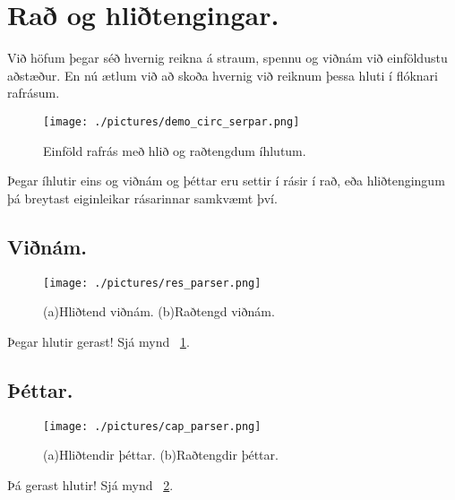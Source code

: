 \section{Rað og hliðtengingar.}
Við höfum þegar séð hvernig reikna á straum, spennu og viðnám við einföldustu aðstæður. En nú ætlum við að skoða hvernig við reiknum þessa hluti í flóknari
rafrásum.
\begin{figure}[htb]
	\center
		\texttt{[image: ./pictures/demo\_circ\_serpar.png]}
		\caption{Einföld rafrás með hlið og raðtengdum íhlutum.}
\end{figure}
Þegar íhlutir eins og viðnám og þéttar eru settir í rásir í rað, eða hliðtengingum þá breytast eiginleikar rásarinnar samkvæmt því. 

\subsection{Viðnám.}
\begin{figure}[htb]
	\center
		\texttt{[image: ./pictures/res\_parser.png]}
		\caption{(a)Hliðtend viðnám. (b)Raðtengd viðnám.}
		\label{fig:res_parser}
\end{figure}
Þegar hlutir gerast! Sjá mynd ~\ref{fig:res_parser}.

\subsection{Þéttar.}
\begin{figure}[htb]
	\center
		\texttt{[image: ./pictures/cap\_parser.png]}
		\caption{(a)Hliðtendir þéttar. (b)Raðtengdir þéttar.}
		\label{fig:cap_parser}
\end{figure}
Þá gerast hlutir! Sjá mynd ~\ref{fig:cap_parser}.
